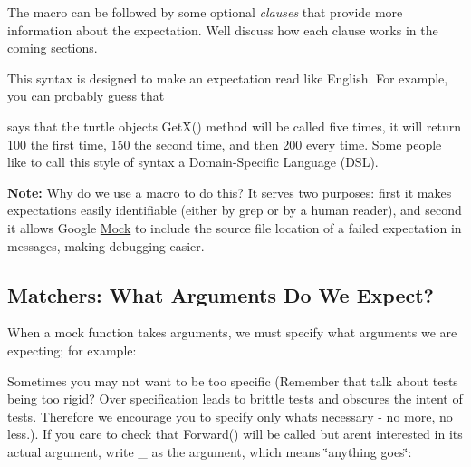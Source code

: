 The macro can be followed by some optional {\itshape clauses} that provide more information about the expectation. We\textquotesingle{}ll discuss how each clause works in the coming sections.

This syntax is designed to make an expectation read like English. For example, you can probably guess that


\begin{DoxyCode}{0}
\end{DoxyCode}


says that the {\ttfamily turtle} object\textquotesingle{}s {\ttfamily Get\+X()} method will be called five times, it will return 100 the first time, 150 the second time, and then 200 every time. Some people like to call this style of syntax a Domain-\/\+Specific Language (D\+SL).

{\bfseries{Note\+:}} Why do we use a macro to do this? It serves two purposes\+: first it makes expectations easily identifiable (either by {\ttfamily grep} or by a human reader), and second it allows Google \mbox{\hyperlink{class_mock}{Mock}} to include the source file location of a failed expectation in messages, making debugging easier.

\subsection*{Matchers\+: What Arguments Do We Expect?}

When a mock function takes arguments, we must specify what arguments we are expecting; for example\+:


\begin{DoxyCode}{0}
\end{DoxyCode}


Sometimes you may not want to be too specific (Remember that talk about tests being too rigid? Over specification leads to brittle tests and obscures the intent of tests. Therefore we encourage you to specify only what\textquotesingle{}s necessary -\/ no more, no less.). If you care to check that {\ttfamily Forward()} will be called but aren\textquotesingle{}t interested in its actual argument, write {\ttfamily \+\_\+} as the argument, which means \char`\"{}anything goes\char`\"{}\+:


